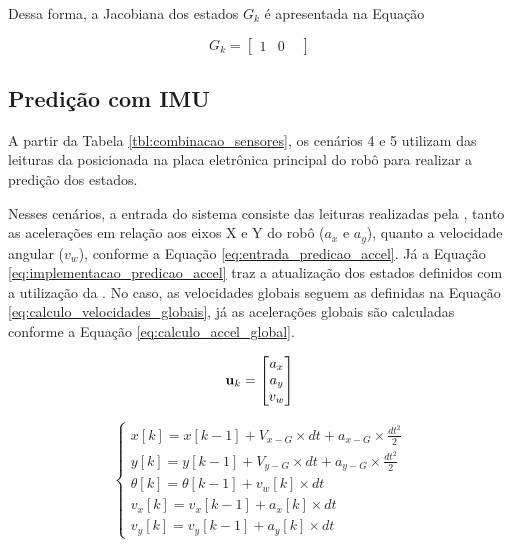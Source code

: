 \documentclass[acronym, symbols, table]{fei}
\begin{document}
			Dessa forma, a Jacobiana dos estados $G_k$ é apresentada na Equação 
			
			\begin{equation}
				G_k = 
				\begin{bmatrix}
					1 & 0 &
				\end{bmatrix}
			\end{equation}
			
		\subsection{Predição com IMU}
		
			A partir da Tabela \ref{tbl:combinacao_sensores}, os cenários 4 e 5 utilizam das leituras da  posicionada na placa eletrônica principal do robô para realizar a predição dos estados.
			
			Nesses cenários, a entrada do sistema consiste das leituras realizadas pela , tanto as acelerações em relação aos eixos X e Y do robô ($a_x$ e $a_y$), quanto a velocidade angular ($v_w$), conforme a Equação \ref{eq:entrada_predicao_accel}. Já a Equação \ref{eq:implementacao_predicao_accel} traz a atualização dos estados definidos com a utilização da . No caso, as velocidades globais seguem as definidas na Equação \ref{eq:calculo_velocidades_globais}, já as acelerações globais são calculadas conforme a Equação \ref{eq:calculo_accel_global}.
			
			\begin{equation}\label{eq:entrada_predicao_accel}
				\text{\textbf{u}}_k = 
				\begin{bmatrix}
					a_x \\
					a_y \\
					v_w
				\end{bmatrix}
			\end{equation}
			
			\begin{equation}\label{eq:implementacao_predicao_accel}
				\begin{cases}
					x[k] = x[k-1] + V_{x-G} \times dt + a_{x-G} \times \frac{dt^2}{2} \\
					y[k] = y[k-1] + V_{y-G} \times dt + a_{y-G} \times \frac{dt^2}{2} \\
					\theta[k] = \theta[k-1] + v_{w}[k] \times dt \\
					v_x[k] = v_{x}[k-1] + a_x[k] \times dt\\
					v_y[k] = v_{y}[k-1] + a_y[k] \times dt
				\end{cases}
			\end{equation}
		
\end{document}
